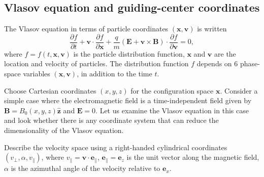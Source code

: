 \documentclass{article}
\begin{document}
\subsection{Vlasov equation and guiding-center coordinates}\label{19-4-23-p1}

The Vlasov equation in terms of particle coordinates $(\mathbf{x},
\mathbf{v})$ is written
\begin{equation}
  \label{22-11-12-1} \frac{\partial f}{\partial t} +\mathbf{v} \cdot
  \frac{\partial f}{\partial \mathbf{x}} + \frac{q}{m} (\mathbf{E}+\mathbf{v}
  \times \mathbf{B}) \cdot \frac{\partial f}{\partial \mathbf{v}} = 0,
\end{equation}
where $f = f (t, \mathbf{x}, \mathbf{v})$ is the particle distribution
function, $\mathbf{x}$ and $\mathbf{v}$ are the location and velocity of
particles. The distribution function $f$ depends on 6 phase-space variables
$(\mathbf{x}, \mathbf{v})$, in addition to the time $t$.

Choose Cartesian coordinates $(x, y, z)$ for the configuration space
$\mathbf{x}$. Consider a simple case where the electromagnetic field is a
time-independent field given by $\mathbf{B}= B_0 (x, y, z) \hat{\mathbf{z}}$
and $\mathbf{E}= 0$. Let us examine the Vlasov equation in this case and look
whether there is any coordinate system that can reduce the dimensionality of
the Vlasov equation.

Describe the velocity space using a right-handed cylindrical coordinates
$(v_{\perp}, \alpha, v_{\parallel})$, where $v_{\parallel} =\mathbf{v} \cdot
\mathbf{e}_{\parallel}$, $\mathbf{e}_{\parallel} =\mathbf{e}_z$ is the unit
vector along the magnetic field, $\alpha$ is the azimuthal angle of the
velocity relative to $\mathbf{e}_x$.
\end{document}

